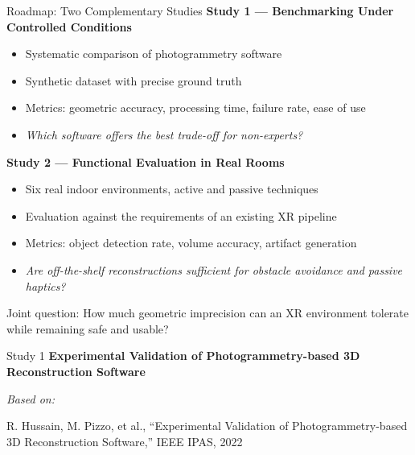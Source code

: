 \documentclass[aspectratio=169, 12pt]{beamer}
\begin{document}
\begin{frame}{Roadmap: Two Complementary Studies}
	\textbf{\textcolor{gbAqua}{Study 1 — Benchmarking Under Controlled Conditions}}
	
	\begin{itemize}
		\item Systematic comparison of photogrammetry software
		\item Synthetic dataset with precise ground truth
		\item Metrics: geometric accuracy, processing time, failure rate, ease of use
		\item \textit{Which software offers the best trade-off for non-experts?}
	\end{itemize}
	
	\vspace{0.3cm}
	
	{\color{gray}
\textbf{Study 2 — Functional Evaluation in Real Rooms}

\begin{itemize}
    \item Six real indoor environments, active and passive techniques
    \item Evaluation against the requirements of an existing XR pipeline
    \item Metrics: object detection rate, volume accuracy, artifact generation
    \item \textit{Are off-the-shelf reconstructions sufficient for obstacle avoidance and passive haptics?}
\end{itemize}
}
	
	\vspace{0.2cm}
	
	\alert{Joint question:} How much geometric imprecision can an XR environment tolerate while remaining safe and usable?
\end{frame}




\begin{frame}{Study 1}
    \textbf{\textcolor{gbAqua}{Experimental Validation of Photogrammetry-based 3D Reconstruction Software}}
    
    \vspace{0.5cm}
    
    
        \small\textit{Based on:}
        
        \vspace{0.2cm}
        
        {\footnotesize R. Hussain, M. Pizzo, et al., ``Experimental Validation of Photogrammetry-based 3D Reconstruction Software,'' IEEE IPAS, 2022}
   
\end{frame}
\end{document}
